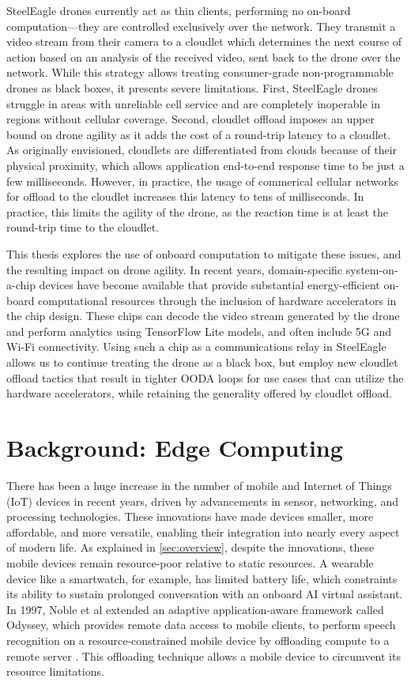 SteelEagle drones currently act as thin clients, performing no on-board
computation---they are controlled exclusively over the network. They transmit a
video stream from their camera to a cloudlet which determines the next course
of action based on an analysis of the received video, sent back to the drone
over the network. While this strategy allows treating consumer-grade
non-programmable drones as black boxes, it presents severe limitations. First,
SteelEagle drones struggle in areas with unreliable cell service and are
completely inoperable in regions without cellular coverage. Second, cloudlet
offload imposes an upper bound on drone agility as it adds the cost of a
round-trip latency to a cloudlet. As originally envisioned, cloudlets are
differentiated from clouds because of their physical proximity, which allows
application end-to-end response time to be just a few milliseconds. However, in
practice, the usage of commerical cellular networks for offload to the cloudlet
increases this latency to tens of milliseconds. In practice, this limits the
agility of the drone, as the reaction time is at least the round-trip time to
the cloudlet.

This thesis explores the use of onboard computation to mitigate these issues,
and the resulting impact on drone agility. In recent years, domain-specific
system-on-a-chip devices have become available that provide substantial
energy-efficient on-board computational resources through the inclusion of
hardware accelerators in the chip design. These chips can decode the video
stream generated by the drone and perform analytics using TensorFlow Lite
models, and often include 5G and Wi-Fi connectivity. Using such a chip as a
communications relay in SteelEagle allows us to continue treating the drone as
a black box, but employ new cloudlet offload tactics that result in tighter
OODA loops for use cases that can utilize the hardware accelerators, while
retaining the generality offered by cloudlet offload.

\section{Background: Edge Computing}
\label{sec:bg-edge}

There has been a huge increase in the number of mobile and Internet of Things
(IoT) devices in recent years, driven by advancements in sensor, networking,
and processing technologies.  These innovations have made devices smaller, more
affordable, and more versatile, enabling their integration into nearly every
aspect of modern life. As explained in \cref{sec:overview}, despite the
innovations, these mobile devices remain resource-poor relative to static
resources. A wearable device like a smartwatch, for example, has limited
battery life, which constraints its ability to sustain prolonged conversation
with an onboard AI virtual assistant. In 1997, Noble et al extended an adaptive
application-aware framework called Odyssey, which provides remote data access
to mobile clients, to perform speech recognition on a resource-constrained
mobile device by offloading compute to a remote server \cite{noble1997}. This
offloading technique allows a mobile device to circumvent its resource
limitations.

